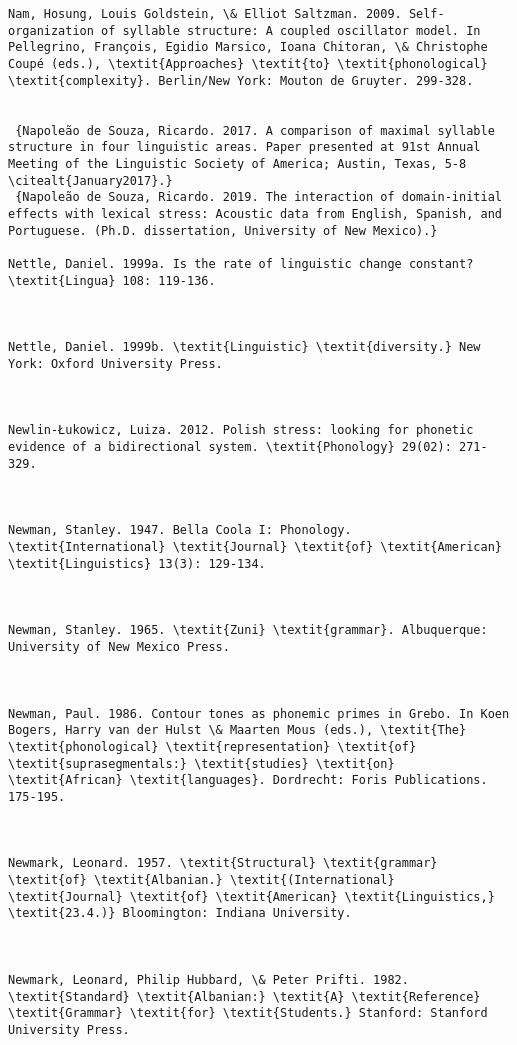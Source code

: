 \begin{verbatim}
Nam, Hosung, Louis Goldstein, \& Elliot Saltzman. 2009. Self-organization of syllable structure: A coupled oscillator model. In Pellegrino, François, Egidio Marsico, Ioana Chitoran, \& Christophe Coupé (eds.), \textit{Approaches} \textit{to} \textit{phonological} \textit{complexity}. Berlin/New York: Mouton de Gruyter. 299-328.


 {Napoleão de Souza, Ricardo. 2017. A comparison of maximal syllable structure in four linguistic areas. Paper presented at 91st Annual Meeting of the Linguistic Society of America; Austin, Texas, 5-8 \citealt{January2017}.}
 {Napoleão de Souza, Ricardo. 2019. The interaction of domain-initial effects with lexical stress: Acoustic data from English, Spanish, and Portuguese. (Ph.D. dissertation, University of New Mexico).}

Nettle, Daniel. 1999a. Is the rate of linguistic change constant? \textit{Lingua} 108: 119-136.



Nettle, Daniel. 1999b. \textit{Linguistic} \textit{diversity.} New York: Oxford University Press.



Newlin-Łukowicz, Luiza. 2012. Polish stress: looking for phonetic evidence of a bidirectional system. \textit{Phonology} 29(02): 271-329.



Newman, Stanley. 1947. Bella Coola I: Phonology. \textit{International} \textit{Journal} \textit{of} \textit{American} \textit{Linguistics} 13(3): 129-134.



Newman, Stanley. 1965. \textit{Zuni} \textit{grammar}. Albuquerque: University of New Mexico Press.



Newman, Paul. 1986. Contour tones as phonemic primes in Grebo. In Koen Bogers, Harry van der Hulst \& Maarten Mous (eds.), \textit{The} \textit{phonological} \textit{representation} \textit{of} \textit{suprasegmentals:} \textit{studies} \textit{on} \textit{African} \textit{languages}. Dordrecht: Foris Publications. 175-195.



Newmark, Leonard. 1957. \textit{Structural} \textit{grammar} \textit{of} \textit{Albanian.} \textit{(International} \textit{Journal} \textit{of} \textit{American} \textit{Linguistics,} \textit{23.4.)} Bloomington: Indiana University.



Newmark, Leonard, Philip Hubbard, \& Peter Prifti. 1982. \textit{Standard} \textit{Albanian:} \textit{A} \textit{Reference} \textit{Grammar} \textit{for} \textit{Students.} Stanford: Stanford University Press.




\end{verbatim}
